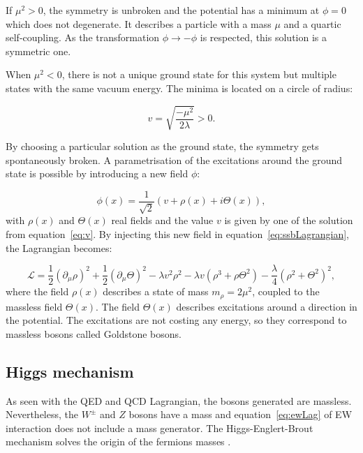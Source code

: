       If $\mu^{2} > 0$, the symmetry is unbroken and the potential has a minimum at $\phi = 0$ which does not degenerate.
      It describes a particle with a mass $\mu$ and a quartic self-coupling.
      As the transformation $\phi \rightarrow  - \phi$ is respected, this solution is a symmetric one.

      When $\mu^{2} < 0$, there is not a unique ground state for this system but multiple states with the same vacuum energy.
      The minima is located on a circle of radius:

      \begin{equation}
        v = \sqrt{\frac{- \mu^2}{2\lambda}} > 0.
        \label{eq:v}
      \end{equation}

      By choosing a particular solution as the ground state, the symmetry gets spontaneously broken.
      A parametrisation of the excitations around the ground state is possible by introducing a new field $\phi$:

      \begin{equation}
        \phi(x) = \frac{1}{\sqrt{2}} \left( v + \rho(x) + i\Theta(x) \right),
      \end{equation}
      with $\rho(x)$ and $\Theta(x)$ real fields and the value $v$ is given by one of the solution from equation~\ref{eq:v}.
      By injecting this new field in equation~\ref{eq:ssbLagrangian}, the Lagrangian becomes:

      \begin{equation}
        \mathcal{L} = \frac{1}{2} (\partial_{\mu}\rho)^2 + \frac{1}{2}(\partial_{\mu}\Theta)^2 - \lambda v^2 \rho^2 - \lambda v (\rho^3 +\rho \Theta^2) - \frac{\lambda}{4}(\rho^2 + \Theta^2)^2,
      \end{equation}
      where the field $\rho(x)$ describes a state of mass $m_{\rho} = 2 \mu^2$, coupled to the massless field $\Theta(x)$.
      The field $\Theta(x)$ describes excitations around a direction in the potential.
      The excitations are not costing any energy, so they correspond to massless bosons called Goldstone bosons.

      \subsection{Higgs mechanism}
      \label{sec:higgsMechanism}
      
      As seen with the \gls{QED} and \gls{QCD} Lagrangian, the bosons generated are massless.
      Nevertheless, the $W^{\pm}$ and $Z$ bosons have a mass and equation~\ref{eq:ewLag} of \gls{EW} interaction does not include a mass generator.
      The Higgs-Englert-Brout mechanism solves the origin of the fermions masses \cite{PhysRevLett.13.508}\cite{1964PhRvL..13..321E}.
       
